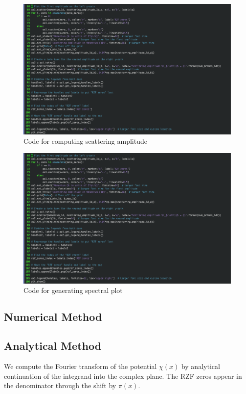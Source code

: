 \documentclass[11pt, oneside]{article}   	%
\begin{document}
  \begin{figure}[htbp]
\begin{center}
    \includegraphics[width=0.8\linewidth]{../images/scattering_code.png}
   
\caption{Code for computing scattering amplitude}
\label{default}
\end{center}
\end{figure}
 
 
 \begin{figure}[htbp]
\begin{center}
    \includegraphics[width=0.8\linewidth]{../images/plotting_code.png}
   
\caption{Code for generating spectral plot}
\label{default}
\end{center}
\end{figure}
 
\subsection{Numerical Method}

\subsection{Analytical Method}
We compute the Fourier transform of the potential $\chi(x)$ by analytical continuation of the integrand into the complex plane. 
The RZF zeros appear in the denominator through the shift by $\pi(x)$. 
   
\end{document}
